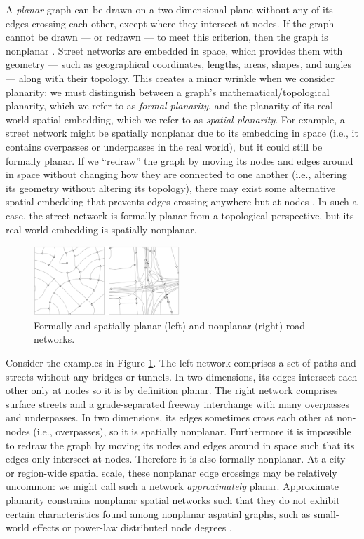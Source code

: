 \documentclass[Afour,sageh,times]{sagej}
\begin{document}
A \emph{planar} graph can be drawn on a two-dimensional plane without any of its edges crossing each other, except where they intersect at nodes. If the graph cannot be drawn --- or redrawn --- to meet this criterion, then the graph is nonplanar \citep{trudeau_introduction_1994}. Street networks are embedded in space, which provides them with geometry --- such as geographical coordinates, lengths, areas, shapes, and angles --- along with their topology. This creates a minor wrinkle when we consider planarity: we must distinguish between a graph's mathematical/topological planarity, which we refer to as \emph{formal planarity}, and the planarity of its real-world spatial embedding, which we refer to as \emph{spatial planarity}. For example, a street network might be spatially nonplanar due to its embedding in space (i.e., it contains overpasses or underpasses in the real world), but it could still be formally planar. If we \enquote{redraw} the graph by moving its nodes and edges around in space without changing how they are connected to one another (i.e., altering its geometry without altering its topology), there may exist some alternative spatial embedding that prevents edges crossing anywhere but at nodes \citep[p.~6]{barthelemy_morphogenesis_2017}. In such a case, the street network is formally planar from a topological perspective, but its real-world embedding is spatially nonplanar.

\begin{figure}[tbp]
	\center
	\includegraphics[width=0.49\textwidth]{figures_tables/planar_vs_not.png}
	\caption{Formally and spatially planar (left) and nonplanar (right) road networks.}
	\label{fig:planar_vs_not}
\end{figure}

Consider the examples in Figure \ref{fig:planar_vs_not}. The left network comprises a set of paths and streets without any bridges or tunnels. In two dimensions, its edges intersect each other only at nodes so it is by definition planar. The right network comprises surface streets and a grade-separated freeway interchange with many overpasses and underpasses. In two dimensions, its edges sometimes cross each other at non-nodes (i.e., overpasses), so it is spatially nonplanar. Furthermore it is impossible to redraw the graph by moving its nodes and edges around in space such that its edges only intersect at nodes. Therefore it is also formally nonplanar. At a city- or region-wide spatial scale, these nonplanar edge crossings may be relatively uncommon: we might call such a network \emph{approximately} planar. Approximate planarity constrains nonplanar spatial networks such that they do not exhibit certain characteristics found among nonplanar aspatial graphs, such as small-world effects or power-law distributed node degrees \citep{crucitti_centrality_2006,fischer_spatial_2014}.
\end{document}
